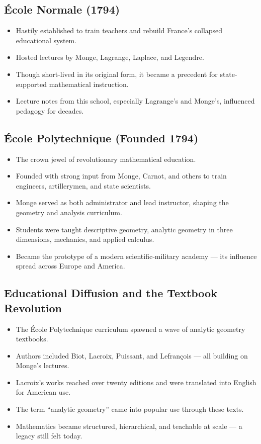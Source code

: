 \documentclass[9pt]{article}
\begin{document}
\subsection*{École Normale (1794)}
\begin{itemize}
  \item Hastily established to train teachers and rebuild France’s collapsed educational system.
  \item Hosted lectures by Monge, Lagrange, Laplace, and Legendre.
  \item Though short-lived in its original form, it became a precedent for state-supported mathematical instruction.
  \item Lecture notes from this school, especially Lagrange’s and Monge’s, influenced pedagogy for decades.
\end{itemize}

\subsection*{École Polytechnique (Founded 1794)}
\begin{itemize}
  \item The crown jewel of revolutionary mathematical education.
  \item Founded with strong input from Monge, Carnot, and others to train engineers, artillerymen, and state scientists.
  \item Monge served as both administrator and lead instructor, shaping the geometry and analysis curriculum.
  \item Students were taught descriptive geometry, analytic geometry in three dimensions, mechanics, and applied calculus.
  \item Became the prototype of a modern scientific-military academy — its influence spread across Europe and America.
\end{itemize}

\subsection*{Educational Diffusion and the Textbook Revolution}
\begin{itemize}
  \item The École Polytechnique curriculum spawned a wave of analytic geometry textbooks.
  \item Authors included Biot, Lacroix, Puissant, and Lefrançois — all building on Monge’s lectures.
  \item Lacroix’s works reached over twenty editions and were translated into English for American use.
  \item The term “analytic geometry” came into popular use through these texts.
  \item Mathematics became structured, hierarchical, and teachable at scale — a legacy still felt today.
\end{itemize}
\end{document}

